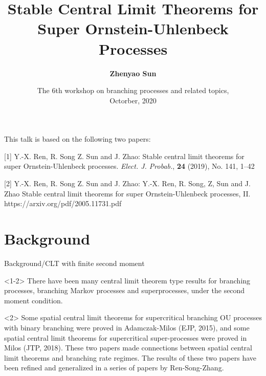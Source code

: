 \documentclass[xcolor=dvipsnames]{beamer}
\title[Stable CLT for superprocesses]{Stable Central Limit Theorems for Super Ornstein-Uhlenbeck Processes}
\author[Zhenyao Sun]{ 
	{\bf \Large Zhenyao Sun  }
}
\institute[]{Joint work with {\bf Yan-Xia Ren}, {\bf Renming Song} and {\bf Jianjie Zhao}}
\date[]{
	The 6th workshop on branching processes and related topics,
	\\ Octorber, 2020}
\begin{document}
\frame{\titlepage}

\begin{frame}
	\vfill This talk is based on the following two papers:
	
	\vfill [1] Y.-X. Ren, R. Song Z. Sun and J. Zhao: 
	Stable central limit theorems for super Ornstein-Uhlenbeck processes. 
	{\it Elect. J. Probab.}, \textbf{24} (2019), No. 141, 1--42
	
	\vfill [2] Y.-X. Ren, R. Song Z. Sun and J. Zhao: 
	Y.-X. Ren, R. Song, Z, Sun and J. Zhao Stable central limit theorems for super 
	Ornstein-Uhlenbeck processes, II. https://arxiv.org/pdf/2005.11731.pdf
\end{frame}

\section{Background}


\begin{frame}{Background/CLT with finite second moment}
\begin{block}{}<1-2>
	There have been many {\color{Bittersweet}central limit theorem} type results for {\color{blue} branching processes}, {\color{blue} branching Markov processes} and {\color{blue} superprocesses}, under the {\color{PineGreen} second moment condition}.
\end{block}
\begin{block}{}<2>
	Some {\color{Bittersweet}spatial central limit theorems} for {\color{PineGreen}supercritical} {\color{blue}branching OU processes} with {\color{PineGreen} binary branching} were proved in Adamczak-Milos (EJP, 2015), and some {\color{Bittersweet}spatial central limit theorems} for {\color{PineGreen} supercritical} {\color{blue} super-processes} were proved in Milos (JTP, 2018). 
	These two papers made connections between {\color{Bittersweet}spatial central limit theorems} and {\color{Bittersweet}branching rate regimes}. The results of these two papers have been refined and generalized in a series of papers by Ren-Song-Zhang.
\end{block}
\end{frame}
\end{document}
